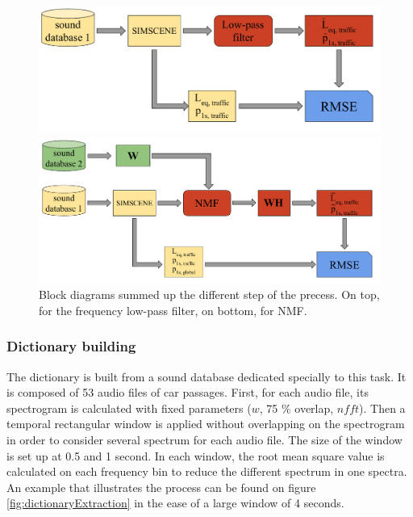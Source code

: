 \documentclass[twocolumn,a4paper,10pt]{article}
\begin{document}
\begin{figure}[!t]
\centering
	\begin{minipage}[t]{.48\textwidth}
		\centering
		\includegraphics[width=.9\linewidth]{../image/bloc_diagram_filtrage_EN.pdf}
	\end{minipage}
	\begin{minipage}[t]{.48\textwidth}
		\centering
		\includegraphics[width=.9\linewidth]{../image/bloc_diagram_NMF_EN.pdf}
	\end{minipage}
	\caption{Block diagrams summed up the different step of the precess. On top, for the frequency low-pass filter, on bottom, for NMF.}
	\label{fig:block_diagram_protocol}
\end{figure}

\subsubsection{Dictionary building}

The dictionary is built from a sound database dedicated specially to this task. It is composed of 53 audio files of car passages. First, for each audio file, its spectrogram is calculated with fixed parameters ($w$, 75 $\%$ overlap, $nfft$). Then a temporal rectangular window is applied without overlapping on the spectrogram in order to consider several spectrum for each audio file. The size of the window is set up at 0.5 and 1 second. In each window, the root mean square value is calculated on each frequency bin to reduce the different spectrum in one spectra.  An example that illustrates the process can be found on figure \ref{fig:dictionaryExtraction} in the ease of a large window of 4 seconds.
\end{document}
